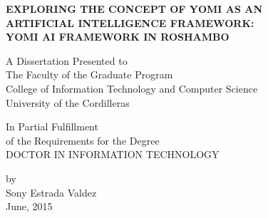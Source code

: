 \begin{titlepage}
    \begin{center}
\ifnotUCFormat
        \vspace*{0cm}        
\fi      

        \normalsize\textbf{EXPLORING THE CONCEPT OF YOMI AS AN \\ ARTIFICIAL INTELLIGENCE FRAMEWORK:} \\
        \normalsize\textbf{YOMI AI FRAMEWORK IN ROSHAMBO} \\
		                          
        \vfill
                


 		  \normalsize
 		  A Dissertation Presented to \\
	     The Faculty of the Graduate Program \\
	     College of Information Technology and Computer Science \\
	     University of the Cordilleras

\ifnotUCFormat
		 \vspace{1in}
\else
        \vfill
\fi
        
		  In Partial Fulfillment \\
		  of the Requirements for the Degree \\
		  DOCTOR IN INFORMATION TECHNOLOGY


        \vfill

		  by	\\
		  Sony Estrada Valdez	\\
		  		
                
                
			June, 2015
    \end{center}
\end{titlepage}

